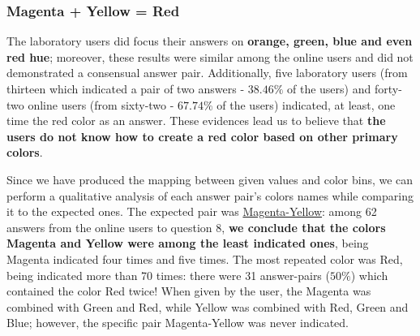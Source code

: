 \subsubsection{Magenta + Yellow = Red}
%
The laboratory users did focus their answers on \textbf{orange, green, blue and even red hue}; moreover,
these results were similar among the online users and did not demonstrated a consensual answer pair.
Additionally, five laboratory users (from thirteen which indicated a pair of two answers - $38.46\%$ of the users)
and forty-two online users (from sixty-two - $67.74\%$ of the users) indicated, at least, one time the red color
as an answer. These evidences lead us to believe that \textbf{the users do not know how to create a red color
based on other primary colors}. \par
%
Since we have produced the mapping between given values and color bins, we can perform a qualitative
analysis of each answer pair's colors names while comparing it to the expected ones. The expected pair was
\ul{Magenta-Yellow}: among 62 answers from the online users to question 8, \textbf{we conclude that the colors
Magenta and Yellow were among the least indicated ones}, being Magenta indicated four times and five times. The
most repeated color was Red, being indicated more than
70 times: there were 31 answer-pairs ($50\%$) which contained the color Red twice! When given by the user, the
Magenta was combined with Green and Red, while Yellow was combined with Red, Green and Blue; however, the specific
pair Magenta-Yellow was never indicated.
%
